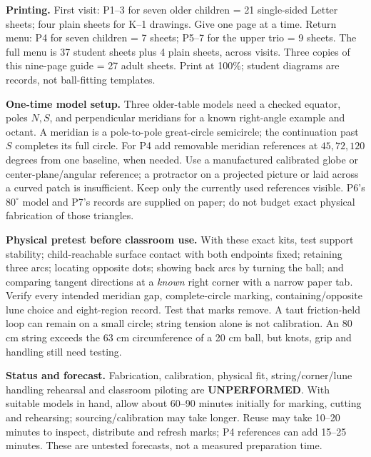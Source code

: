 \documentclass[11pt,letterpaper]{article}
\newcommand{\degc}{^\circ}
\begin{document}
\textbf{Printing.} First visit: P1--3 for seven older children = 21 single-sided Letter sheets; four plain sheets for K--1 drawings. Give one page at a time. Return menu: P4 for seven children = 7 sheets; P5--7 for the upper trio = 9 sheets. The full menu is 37 student sheets plus 4 plain sheets, across visits. Three copies of this nine-page guide = 27 adult sheets. Print at 100\%; student diagrams are records, not ball-fitting templates.

\textbf{One-time model setup.} Three older-table models need a checked equator, poles $N,S$, and perpendicular meridians for a known right-angle example and octant. A meridian is a pole-to-pole great-circle semicircle; the continuation past $S$ completes its full circle. For P4 add removable meridian references at $45,72,120$ degrees from one baseline, when needed. Use a manufactured calibrated globe or center-plane/angular reference; a protractor on a projected picture or laid across a curved patch is insufficient. Keep only the currently used references visible. P6's $80\degc$ model and P7's records are supplied on paper; do not budget exact physical fabrication of those triangles.

\textbf{Physical pretest before classroom use.} With these exact kits, test support stability; child-reachable surface contact with both endpoints fixed; retaining three arcs; locating opposite dots; showing back arcs by turning the ball; and comparing tangent directions at a \emph{known} right corner with a narrow paper tab. Verify every intended meridian gap, complete-circle marking, containing/opposite lune choice and eight-region record. Test that marks remove. A taut friction-held loop can remain on a small circle; string tension alone is not calibration. An 80 cm string exceeds the 63 cm circumference of a 20 cm ball, but knots, grip and handling still need testing.

\textbf{Status and forecast.} Fabrication, calibration, physical fit, string/corner/lune handling rehearsal and classroom piloting are \textbf{UNPERFORMED}. With suitable models in hand, allow about 60--90 minutes initially for marking, cutting and rehearsing; sourcing/calibration may take longer. Reuse may take 10--20 minutes to inspect, distribute and refresh marks; P4 references can add 15--25 minutes. These are untested forecasts, not a measured preparation time.
\end{document}
